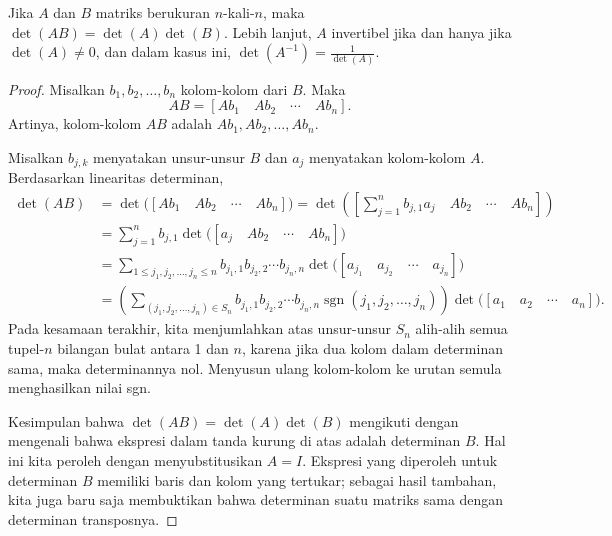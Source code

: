 \begin{prop}
Jika $A$ dan $B$ matriks berukuran $n$-kali-$n$, maka $\det(AB) = \det(A)\det(B)$.
Lebih lanjut, $A$ invertibel jika dan hanya jika $\det(A) \neq 0$, dan dalam
kasus ini, $\det(A^{-1}) = \frac{1}{\det(A)}$.
\end{prop}

\begin{proof}
Misalkan $b_1,b_2,\ldots,b_n$ kolom-kolom dari $B$.  Maka
\begin{equation*}
AB = [ Ab_1 \quad Ab_2 \quad  \cdots \quad  Ab_n ] .
\end{equation*}
Artinya, kolom-kolom $AB$ adalah
$Ab_1,Ab_2,\ldots,Ab_n$.

Misalkan $b_{j,k}$ menyatakan unsur-unsur $B$ dan
$a_j$ menyatakan kolom-kolom $A$.
Berdasarkan linearitas determinan,
\begin{equation*}
\begin{split}
\det(AB) & =
\det \bigl([ Ab_1 \quad Ab_2 \quad  \cdots \quad  Ab_n ] \bigr) =
\det \left(\left[ \sum_{j=1}^n b_{j,1} a_j \quad Ab_2 \quad  \cdots \quad  Ab_n \right]\right) \\
& =
\sum_{j=1}^n
b_{j,1}
\det \bigl([ a_j \quad Ab_2 \quad  \cdots \quad  Ab_n ]\bigr) \\
& =
\sum_{1 \leq j_1,j_2,\ldots,j_n \leq n}
b_{j_1,1}
b_{j_2,2}
\cdots
b_{j_n,n}
\det \bigl([ a_{j_1} \quad a_{j_2} \quad  \cdots \quad  a_{j_n} ]\bigr) \\
& =
\left(
\sum_{(j_1,j_2,\ldots,j_n) \in S_n}
b_{j_1,1}
b_{j_2,2}
\cdots
b_{j_n,n}
\operatorname{sgn}(j_1,j_2,\ldots,j_n)
\right)
\det \bigl([ a_{1} \quad a_{2} \quad  \cdots \quad  a_{n} ]\bigr) .
\end{split}
\end{equation*}
Pada kesamaan terakhir, kita menjumlahkan atas unsur-unsur $S_n$
alih-alih semua tupel-$n$ bilangan bulat antara 1 dan $n$,
karena
jika dua kolom dalam determinan sama, maka
determinannya nol.  Menyusun ulang kolom-kolom ke
urutan semula menghasilkan nilai sgn.

Kesimpulan bahwa $\det(AB) = \det(A)\det(B)$
mengikuti dengan mengenali bahwa ekspresi dalam tanda kurung di atas adalah determinan $B$.
Hal ini kita peroleh dengan menyubstitusikan $A=I$.
Ekspresi yang diperoleh untuk determinan $B$ memiliki baris dan kolom
yang tertukar; sebagai hasil tambahan, kita juga baru saja membuktikan bahwa determinan
suatu matriks sama dengan determinan transposnya.


\end{proof}
